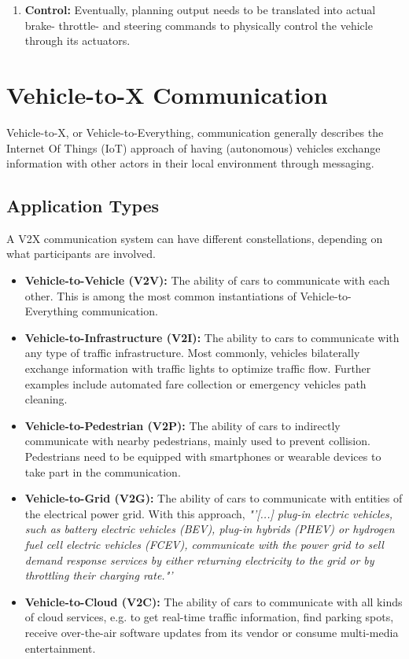 \begin{enumerate}
	\item \textbf{Control:} Eventually, planning output needs to be translated into actual brake- throttle- and steering commands to physically control the vehicle through its actuators. 
\end{enumerate}

\section{Vehicle-to-X Communication}
\label{sec:background:v2x_communication}
Vehicle-to-X, or Vehicle-to-Everything, communication generally describes the Internet Of Things (IoT) approach of having (autonomous) vehicles exchange information with other actors in their local environment through messaging.

\subsection{Application Types}
\label{subsec:background:application_types}
A V2X communication system can have different constellations, depending on what participants are involved.

\begin{itemize}
	\item \textbf{Vehicle-to-Vehicle (V2V):} The ability of cars to communicate with each other. This is among the most common instantiations of Vehicle-to-Everything communication. 
	\item  \textbf{Vehicle-to-Infrastructure (V2I):} The ability to cars to communicate with any type of traffic infrastructure. Most commonly, vehicles bilaterally exchange information with traffic lights to optimize traffic flow. Further examples include automated fare collection or emergency vehicles path cleaning.
	\item \textbf{Vehicle-to-Pedestrian (V2P):} The ability of cars to indirectly communicate with nearby pedestrians, mainly used to prevent collision. Pedestrians need to be equipped with smartphones or wearable devices to take part in the communication.
	\item \textbf{Vehicle-to-Grid (V2G):} The ability of cars to communicate with entities of the electrical power grid. With this approach, \textit{"'[...] plug-in electric vehicles, such as battery electric vehicles (BEV), plug-in hybrids (PHEV) or hydrogen fuel cell electric vehicles (FCEV), communicate with the power grid to sell demand response services by either returning electricity to the grid or by throttling their charging rate."'} \cite{wiki:v2g}
	\item \textbf{Vehicle-to-Cloud (V2C):} The ability of cars to communicate with all kinds of cloud services, e.g. to get real-time traffic information, find parking spots, receive over-the-air software updates from its vendor or consume multi-media entertainment.
\end{itemize}

